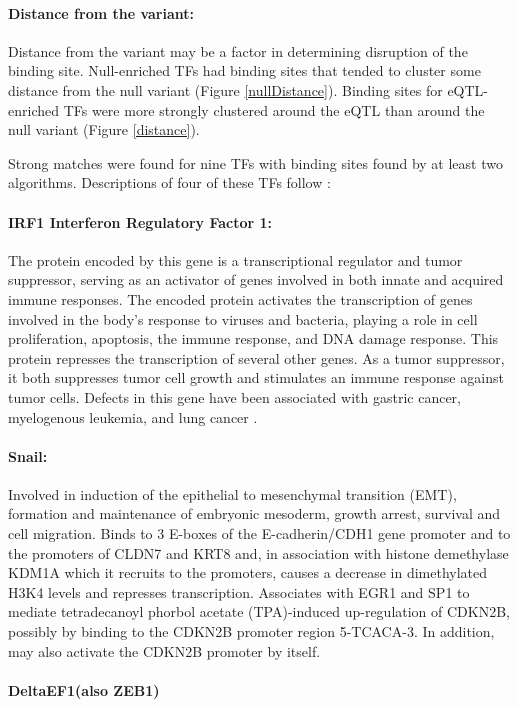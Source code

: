\documentclass[12pt]{article}
\begin{document}
\paragraph{Distance from the variant:} 
Distance from the variant may be a factor in determining disruption of the binding site. Null-enriched TFs had binding sites that tended to cluster some distance from the null variant (Figure \ref{nullDistance}). Binding sites for eQTL-enriched TFs were more strongly clustered around the eQTL than around the null variant (Figure \ref{distance}).

Strong matches were found for nine TFs with binding sites found by at least two algorithms. Descriptions of four of these TFs follow \citep{Weizmann2018}:

\paragraph{IRF1 Interferon Regulatory Factor 1:}
The protein encoded by this gene is a transcriptional regulator and tumor suppressor, serving as an activator of genes involved in both innate and acquired immune responses. The encoded protein activates the transcription of genes involved in the body's response to viruses and bacteria, playing a role in cell proliferation, apoptosis, the immune response, and DNA damage response. This protein represses the transcription of several other genes. As a tumor suppressor, it both suppresses tumor cell growth and stimulates an immune response against tumor cells. Defects in this gene have been associated with gastric cancer, myelogenous leukemia, and lung cancer \citep{Weizmann2018}.

\paragraph{Snail:}
Involved in induction of the epithelial to mesenchymal transition (EMT), formation and maintenance of embryonic mesoderm, growth arrest, survival and cell migration. Binds to 3 E-boxes of the E-cadherin/CDH1 gene promoter and to the promoters of CLDN7 and KRT8 and, in association with histone demethylase KDM1A which it recruits to the promoters, causes a decrease in dimethylated H3K4 levels and represses transcription. Associates with EGR1 and SP1 to mediate tetradecanoyl phorbol acetate (TPA)-induced up-regulation of CDKN2B, possibly by binding to the CDKN2B promoter region 5-TCACA-3. In addition, may also activate the CDKN2B promoter by itself.


\paragraph{DeltaEF1(also ZEB1)}
\end{document}

